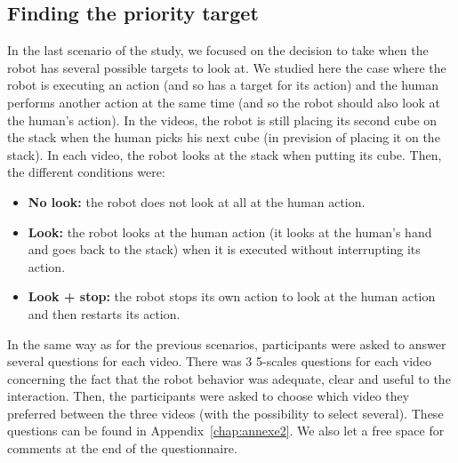 \documentclass[english,a4paper,11pt,twoside]{StyleThese}
\begin{document}
\subsection{Finding the priority target}

In the last scenario of the study, we focused on the decision to take when the robot has several possible targets to look at. We studied here the case where the robot is executing an action (and so has a target for its action) and the human performs another action at the same time (and so the robot should also look at the human's action). In the videos, the robot is still placing its second cube on the stack when the human picks his next cube (in prevision of placing it on the stack). In each video, the robot looks at the stack when putting its cube. Then, the different conditions were:
\begin{itemize}
\item \textbf{No look:} the robot does not look at all at the human action.
\item \textbf{Look:} the robot looks at the human action (it looks at the human's hand and goes back to the stack) when it is executed without interrupting its action.
\item \textbf{Look + stop:} the robot stops its own action to look at the human action and then restarts its action.
\end{itemize}

In the same way as for the previous scenarios, participants were asked to answer several questions for each video. There was 3 5-scales questions for each video concerning the fact that the robot behavior was adequate, clear and useful to the interaction. Then, the participants were asked to choose which video they preferred between the three videos (with the possibility to select several). These questions can be found in Appendix~\ref{chap:annexe2}. We also let a free space for comments at the end of the questionnaire.
\end{document}
